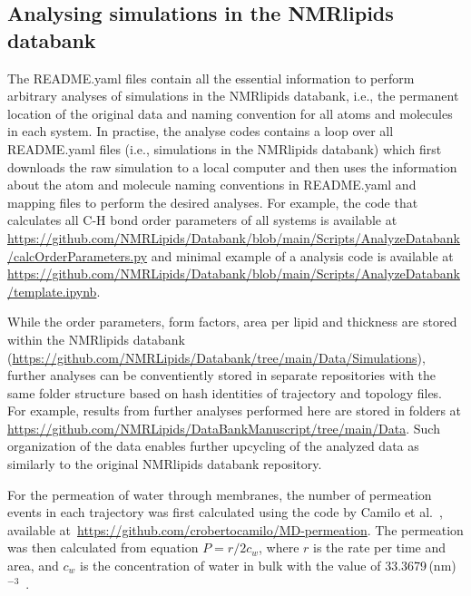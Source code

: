 \documentclass[fleqn,10pt]{wlscirep}
\begin{document}
\subsection{Analysing simulations in the NMRlipids databank}

The README.yaml files contain all the essential information to perform arbitrary analyses of simulations in the NMRlipids databank, i.e., the permanent location of the original data and naming convention for all atoms and molecules in each system. In practise, the analyse codes contains a loop over all README.yaml files (i.e., simulations in the NMRlipids databank) which first downloads the raw simulation to a local computer and then uses the information about the atom and molecule naming conventions in README.yaml and mapping files to perform the desired analyses. For example, the code that calculates all C-H bond order parameters of all systems is available at \url{https://github.com/NMRLipids/Databank/blob/main/Scripts/AnalyzeDatabank/calcOrderParameters.py} and minimal example of a analysis code is available at \url{https://github.com/NMRLipids/Databank/blob/main/Scripts/AnalyzeDatabank/template.ipynb}.

While the order parameters, form factors, area per lipid and thickness are stored within the NMRlipids databank (\url{https://github.com/NMRLipids/Databank/tree/main/Data/Simulations}), further analyses can be conventiently stored in separate repositories with the same folder structure based on hash identities of trajectory and topology files. For example, results from further analyses performed here are stored in folders at \url{https://github.com/NMRLipids/DataBankManuscript/tree/main/Data}. Such organization of the data enables further upcycling of the analyzed data as similarly to the original NMRlipids databank repository.

For the permeation of water through membranes, the number of permeation events in each trajectory was first calculated using the code by Camilo et al.~\cite{camilo2022}, available at~\url{https://github.com/crobertocamilo/MD-permeation}. The permeation was then calculated from equation $P=r/2c_w$, where $r$ is the rate per time and area, and $c_w$ is the concentration of water in bulk with the value of 33.3679\,(nm)$^{-3}$~\cite{venable19}.

\end{document}
